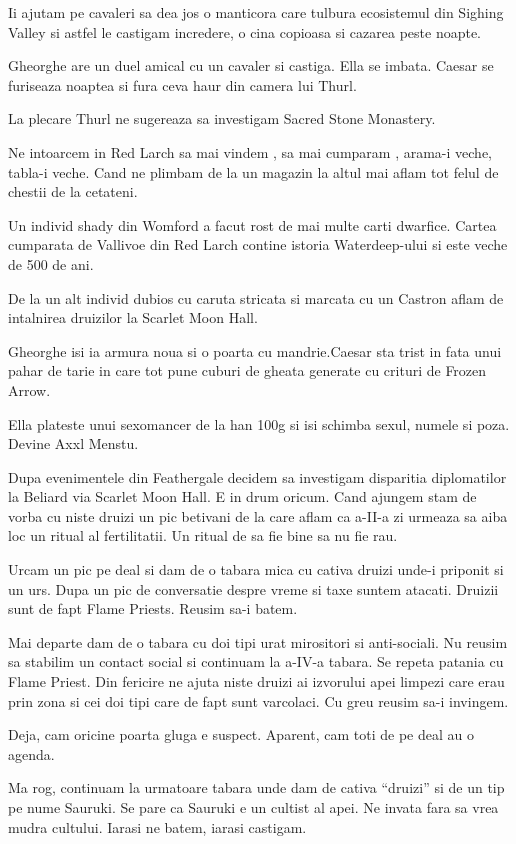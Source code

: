 \documentclass[12pt,oneside]{book}
\begin{document}
Ii ajutam pe cavaleri sa dea jos o manticora care tulbura ecosistemul din Sighing Valley si 
astfel le castigam incredere, o cina copioasa si cazarea peste noapte.

Gheorghe are un duel amical cu un cavaler si castiga. Ella se imbata. Caesar se furiseaza
noaptea si fura ceva haur din camera lui Thurl.

La plecare Thurl ne sugereaza sa investigam Sacred Stone Monastery.

Ne intoarcem in Red Larch sa mai vindem , sa mai cumparam , arama-i veche, tabla-i veche.
Cand ne plimbam de la un magazin la altul mai aflam tot felul de chestii de la cetateni.

Un individ shady din Womford a facut rost de mai multe carti dwarfice. Cartea
cumparata de Vallivoe din Red Larch contine istoria Waterdeep-ului si este veche 
de 500 de ani.

De la un alt individ dubios cu caruta stricata si marcata cu un Castron aflam de intalnirea 
druizilor la Scarlet Moon Hall.

Gheorghe isi ia armura noua si o poarta cu mandrie.Caesar sta trist in fata unui pahar de tarie in  care tot pune cuburi de gheata generate cu crituri de Frozen Arrow.

Ella plateste unui sexomancer de la han 100g si isi schimba sexul, numele si poza. Devine Axxl Menstu.


Dupa evenimentele din Feathergale decidem sa investigam disparitia diplomatilor la Beliard 
via Scarlet Moon Hall. E in drum oricum. Cand ajungem stam de vorba cu niste druizi un
pic betivani de la care aflam ca a-II-a zi urmeaza sa aiba loc un ritual al fertilitatii. Un ritual
de sa fie bine sa nu fie rau. 

Urcam un pic pe deal si dam de o tabara mica cu cativa druizi unde-i priponit si un urs. Dupa un 
pic de conversatie despre vreme si taxe suntem atacati. Druizii sunt de fapt Flame Priests. Reusim
sa-i batem.

Mai departe dam de o tabara cu doi tipi urat mirositori si anti-sociali. Nu reusim sa stabilim
un contact social si continuam la a-IV-a tabara. Se repeta patania cu Flame Priest. Din fericire
ne ajuta niste druizi ai izvorului apei limpezi care erau prin zona si cei doi tipi care de fapt
sunt varcolaci. Cu greu reusim sa-i invingem. 

Deja, cam oricine poarta gluga e suspect. Aparent, cam toti de pe deal au o agenda.

Ma rog, continuam la urmatoare tabara unde dam de cativa ``druizi'' si de un tip pe nume Sauruki. 
Se pare ca Sauruki e un cultist al apei. Ne invata fara sa vrea mudra cultului. Iarasi ne batem,
iarasi castigam.
\end{document}
